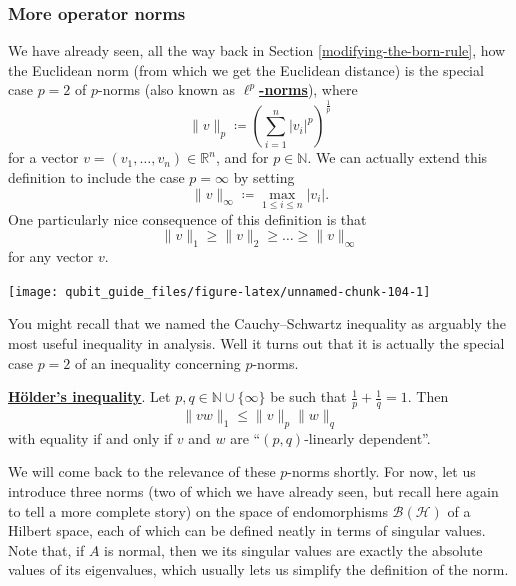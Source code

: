 \documentclass[fleqn,a4paper]{article}
\renewcommand{\footnote}[1]{\sidenotetext[{\color{white}0}\!\!]{\footnotesize #1}}
\newenvironment{idea}{\everypar{\setlength{\parindent}{1.5em}}}{}
\theoremstyle{definition}
\theoremstyle{definition}
\theoremstyle{definition}
\theoremstyle{definition}
\theoremstyle{remark}
\begin{document}
\hypertarget{more-operator-norms}{%
\subsubsection{More operator norms}\label{more-operator-norms}}

We have already seen, all the way back in Section \ref{modifying-the-born-rule}\footnote{Think how far you've come since then!}, how the Euclidean norm (from which we get the Euclidean distance) is the special case \(p=2\) of \(p\)-norms (also known as \href{https://en.wikipedia.org/wiki/Lp_space}{\textbf{\(\ell^p\)-norms}}), where
\[
  \|v\|_p \coloneqq \left( \sum_{i=1}^n |v_i|^p \right)^{\frac{1}{p}}
\]
for a vector \(v=(v_1,\ldots,v_n)\in\mathbb{R}^n\), and for \(p\in\mathbb{N}\).
We can actually extend this definition to include the case \(p=\infty\) by setting
\[
  \|v\|_\infty \coloneqq \max_{1\leqslant i\leqslant n}|v_i|.
\]
One particularly nice consequence of this definition is that
\[
  \|v\|_1 \geqslant\|v\|_2 \geqslant\ldots \geqslant\|v\|_\infty
\]
for any vector \(v\).

\begin{center}\texttt{[image: qubit\_guide\_files/figure-latex/unnamed-chunk-104-1]} \end{center}

You might recall that we named the Cauchy--Schwartz inequality as arguably the most useful inequality in analysis.
Well it turns out that it is actually the special case \(p=2\) of an inequality concerning \(p\)-norms.

\begin{idea}
\href{https://en.wikipedia.org/wiki/H\%25C3\%25B6lder\%27s_inequality}{\textbf{Hölder's inequality}}.
Let \(p,q\in\mathbb{N}\cup\{\infty\}\) be such that \(\frac{1}{p}+\frac{1}{q}=1\).
Then
\[
  \|vw\|_1 \leqslant\|v\|_p\|w\|_q
\]
with equality if and only if \(v\) and \(w\) are ``\((p,q)\)-linearly dependent''.

\end{idea}

We will come back to the relevance of these \(p\)-norms shortly.
For now, let us introduce three norms (two of which we have already seen, but recall here again to tell a more complete story) on the space of endomorphisms \(\mathcal{B}(\mathcal{H})\) of a Hilbert space, each of which can be defined neatly in terms of singular values.
Note that, if \(A\) is normal, then we its singular values are exactly the absolute values of its eigenvalues, which usually lets us simplify the definition of the norm.
\end{document}
